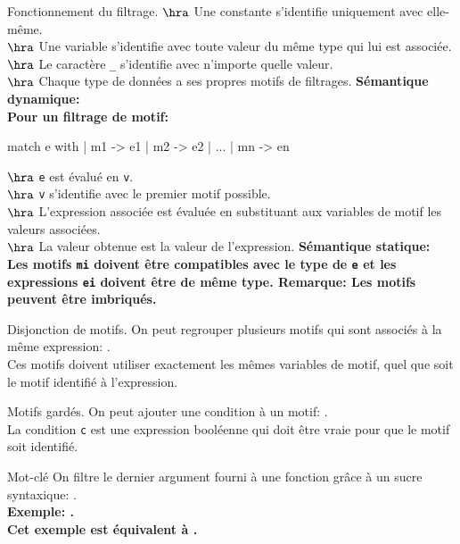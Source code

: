 \documentclass[french, 11pt]{article}
\begin{document}
\begin{defi}{Fonctionnement du filtrage.}{}
    $\hra$ Une constante s'identifie uniquement avec elle-même.\\
    $\hra$ Une variable s'identifie avec toute valeur du même type qui lui est associée.\\
    $\hra$ Le caractère \texttt{\_} s'identifie avec n'importe quelle valeur.\\
    $\hra$ Chaque type de données a ses propres motifs de filtrages.\n
    \bf{Sémantique dynamique:}\\
    Pour un filtrage de motif:
    \begin{pygmented}[lang=ocaml, hidealllines=true, linenos=true]
    match e with | m1 -> e1 | m2 -> e2 | ... | mn -> en
    \end{pygmented}
    $\hra$ \texttt{e} est évalué en \texttt{v}.\\
    $\hra$ \texttt{v} s'identifie avec le premier motif possible.\\
    $\hra$ L'expression associée est évaluée en substituant aux variables de motif les valeurs associées.\\
    $\hra$ La valeur obtenue est la valeur de l'expression.\n
    \bf{Sémantique statique:}\\
    Les motifs \texttt{mi} doivent être compatibles avec le type de \texttt{e} et les expressions \texttt{ei} doivent être de même type.\n
    \bf{Remarque:} Les motifs peuvent être imbriqués.
\end{defi}

\begin{defi}{Disjonction de motifs.}{}
    On peut regrouper plusieurs motifs qui sont associés à la même expression: .\\
    Ces motifs doivent utiliser exactement les mêmes variables de motif, quel que soit le motif identifié à l'expression.
\end{defi}

\begin{defi}{Motifs gardés.}{}
    On peut ajouter une condition à un motif: .\\
    La condition \texttt{c} est une expression booléenne qui doit être vraie pour que le motif soit identifié.
\end{defi}

\begin{defi}{Mot-clé }{}
    On filtre le dernier argument fourni à une fonction grâce à un sucre syntaxique: .\\
    \bf{Exemple:} .\\
    Cet exemple est équivalent à .
\end{defi}
\end{document}
